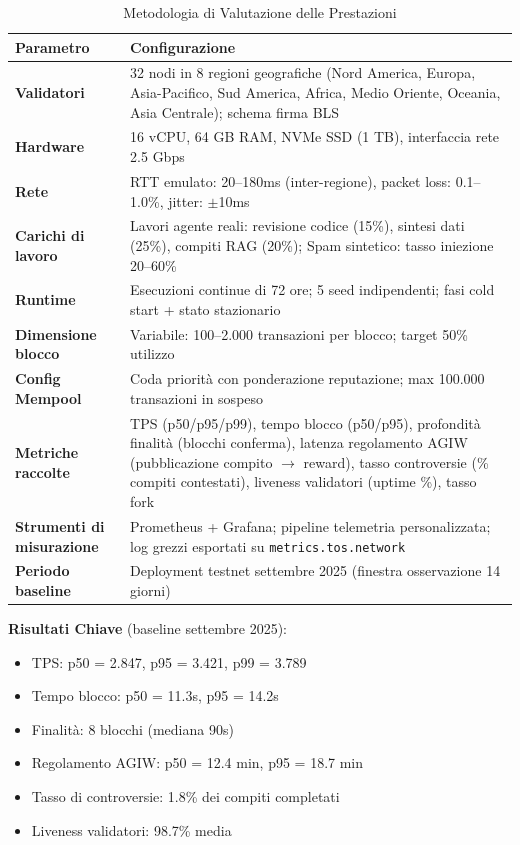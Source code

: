 \documentclass[11pt]{article}
\begin{document}
\begin{table}[H]
\centering
\caption{Metodologia di Valutazione delle Prestazioni}
\label{tab:evaluation-methodology}
\begin{tabular}{@{}p{}p{}@{}}
\toprule
\textbf{Parametro} & \textbf{Configurazione} \\ \midrule
\textbf{Validatori} & 32 nodi in 8 regioni geografiche (Nord America, Europa, Asia-Pacifico, Sud America, Africa, Medio Oriente, Oceania, Asia Centrale); schema firma BLS \\
\textbf{Hardware} & 16 vCPU, 64 GB RAM, NVMe SSD (1 TB), interfaccia rete 2.5 Gbps \\
\textbf{Rete} & RTT emulato: 20--180ms (inter-regione), packet loss: 0.1--1.0\%, jitter: $\pm$10ms \\
\textbf{Carichi di lavoro} & Lavori agente reali: revisione codice (15\%), sintesi dati (25\%), compiti RAG (20\%); Spam sintetico: tasso iniezione 20--60\% \\
\textbf{Runtime} & Esecuzioni continue di 72 ore; 5 seed indipendenti; fasi cold start + stato stazionario \\
\textbf{Dimensione blocco} & Variabile: 100--2.000 transazioni per blocco; target 50\% utilizzo \\
\textbf{Config Mempool} & Coda priorità con ponderazione reputazione; max 100.000 transazioni in sospeso \\
\textbf{Metriche raccolte} & TPS (p50/p95/p99), tempo blocco (p50/p95), profondità finalità (blocchi conferma), latenza regolamento AGIW (pubblicazione compito $\rightarrow$ reward), tasso controversie (\% compiti contestati), liveness validatori (uptime \%), tasso fork \\
\textbf{Strumenti di misurazione} & Prometheus + Grafana; pipeline telemetria personalizzata; log grezzi esportati su \texttt{metrics.tos.network} \\
\textbf{Periodo baseline} & Deployment testnet settembre 2025 (finestra osservazione 14 giorni) \\
\bottomrule
\end{tabular}
\end{table}

\textbf{Risultati Chiave} (baseline settembre 2025):
\begin{itemize}[noitemsep]
  \item TPS: p50 = 2.847, p95 = 3.421, p99 = 3.789
  \item Tempo blocco: p50 = 11.3s, p95 = 14.2s
  \item Finalità: 8 blocchi (mediana 90s)
  \item Regolamento AGIW: p50 = 12.4 min, p95 = 18.7 min
  \item Tasso di controversie: 1.8\% dei compiti completati
  \item Liveness validatori: 98.7\% media
\end{itemize}
\end{document}
